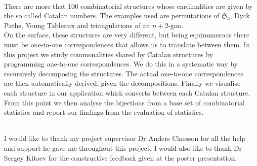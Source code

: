 \documentclass[12pt]{article}
\newcommand{\sym}{\mathfrak{S}}
\begin{document}


\thispagestyle{empty}


\par
{\\ }
There are more that 100 combinatorial structures whose cardinalities are given by the so called Catalan numbers. The examples used are permutations of $\sym_3$, Dyck Paths, Young Tableaux and triangulations of an $n+2$-gon.\\
On the surface, these structures are very different, but being equinumerous there must be one-to-one correspondences that allows us 
to translate between them. In this project we study commonalities shared by Catalan structures by programming one-to-one 
correspondences. We do this in a systematic way by recursively decomposing the structures. The actual one-to-one correspondences are 
then automatically derived, given the decompositions. Finally we visualise each structure in our application which converts between each Catalan structure.\\ 
From this point we then analyse the bijections from a base set of combinatorial statistics and report our findings from the evaluation of statistics. 

\clearpage

\par
{\\ }
I would like to thank my project supervisor Dr Anders Claesson for all the help and support he gave me throughout this project. I would also like to thank Dr Sergey Kitaev for the constructive feedback given at the poster presentation.
\clearpage
\tableofcontents
\newpage


\end{document}
